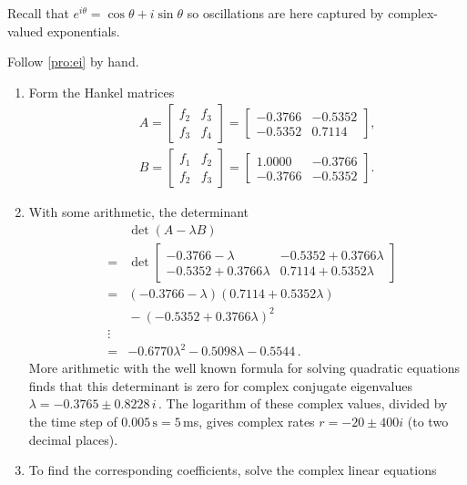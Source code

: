 \begin{draft}
\begin{example}
Recall  that \(e^{i\theta}=\cos\theta+i\sin\theta\) so oscillations are here captured by complex-valued exponentials.

\begin{solution} 
Follow \autoref{pro:ei} by hand. 
\begin{enumerate}
\item 
Form the Hankel matrices
\begin{eqnarray*}&&
A=\begin{bmatrix} f_2&f_3\\f_3&f_4 \end{bmatrix}
=\begin{bmatrix} -0.3766 & -0.5352
\\  -0.5352&   0.7114 \end{bmatrix},
\\&&
B=\begin{bmatrix} f_1&f_2\\f_2&f_3 \end{bmatrix}
=\begin{bmatrix} 1.0000&  -0.3766
\\  -0.3766&  -0.5352 \end{bmatrix}.
\end{eqnarray*}
\item 
With some arithmetic, the determinant 
\begin{eqnarray*}
&&\det(A-\lambda B)
\\&=&\det\begin{bmatrix} -0.3766-\lambda & -0.5352+0.3766\lambda
\\  -0.5352+0.3766\lambda&   0.7114+0.5352\lambda \end{bmatrix} 
\\&=&(-0.3766-\lambda)(0.7114+0.5352\lambda)
\\&&{}
-(-0.5352+0.3766\lambda)^2
\\&\vdots& 
\\&=& -0.6770\lambda^2  -0.5098\lambda  -0.5544\,.
\end{eqnarray*}
More arithmetic with the well known formula for solving quadratic equations finds that this determinant is zero for complex conjugate eigenvalues \(\lambda=-0.3765 \pm 0.8228\,i\)\,.
The logarithm of these complex values, divided by the time step of \(0.005\,\text{s}=5\,\)ms, gives complex rates \(r=-20\pm400i\) (to two decimal places).
\item 
To find the corresponding coefficients, solve the complex linear equations
\begin{eqnarray*}&&

\end{eqnarray*}
\end{enumerate}
\end{solution}
\end{example}
\end{draft}

